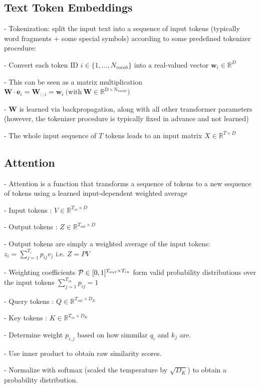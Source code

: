 \subsection*{Text Token Embeddings}

- Tokenization: split the input text into a sequence of input tokens (typically word fragments + some special symbols) according to some predefined tokenizer procedure: 

- Convert each token ID $i\in\{1,...,N_{vocab}\}$ into a real-valued vector $\mathbf{w}_{i}\in\mathbb{R}^{D}$

- This can be seen as a matrix multiplication $\mathbf{W}\cdot\mathbf{e}_{i}=\mathbf{W}_{:,i}=\mathbf{w}_{i}{\mathrm{~(with~\mathbf{W}\in\mathbb{R}^{D \times N_{vocab}}}})$


- $\mathbf{W}$ is learned via backpropagation, along with all other transformer parameters (however, the tokenizer procedure is typically fixed in advance and not learned)

- The whole input sequence of $T$ tokens leads to an input matrix $X\in\mathbb{R}^{T\times D}$

\subsection*{Attention}

- Attention is a function that transforms a sequence of tokens to a new sequence of tokens using a learned input-dependent weighted average

- Input tokens : $V\in\mathbb{R}^{T_{i n}\times D}$

- Output tokens : $Z\in\mathbb{R}^{T_{out}\times D}$

- Output tokens are simply a weighted average of
the input tokens:
$z_{i}=\sum_{j=1}^{T_{i}}p_{i j}v_{j}$ i.e. $Z=P V$

- Weighting coefficients ${\cal P}\in[0,1]^{T_{out}\times T_{i n}}$ form valid probability distributions over the input tokens $\textstyle\sum_{j=1}^{T_{i n}}p_{i j}=1$

- Query tokens : $Q\in\mathbb{R}^{T_{out}\times D_{K}}$

- Key tokens : $K\in\mathbb{R}^{T_{in}\times D_{K}}$

- Determine weight $p_{i,j}$ based on how simmilar $q_i$ and $k_j$ are.

- Use inner product to obtain raw similarity scores.

- Normalize with softmax (scaled the temperature by $\sqrt{D_{K}}$) to obtain a probability distribution.

